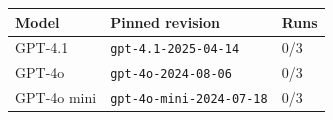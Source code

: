 \begin{tabular}{@{}lll@{}}
\toprule
Model & Pinned revision & Runs\\
\midrule
GPT-4.1 & \texttt{gpt-4.1-2025-04-14} & 0/3\\
GPT-4o & \texttt{gpt-4o-2024-08-06} & 0/3\\
GPT-4o mini & \texttt{gpt-4o-mini-2024-07-18} & 0/3\\
\bottomrule
\end{tabular}
